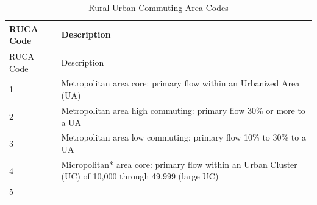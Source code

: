 \documentclass[10pt,]{article}
\begin{document}
\begin{longtable}[]{@{}ll@{}}
\caption{Rural-Urban Commuting Area Codes}\tabularnewline
\toprule
\begin{minipage}[b]{0.08\columnwidth}\raggedright
RUCA Code\strut
\end{minipage} & \begin{minipage}[b]{0.86\columnwidth}\raggedright
Description\strut
\end{minipage}\tabularnewline
\midrule
\endfirsthead
\toprule
\begin{minipage}[b]{0.08\columnwidth}\raggedright
RUCA Code\strut
\end{minipage} & \begin{minipage}[b]{0.86\columnwidth}\raggedright
Description\strut
\end{minipage}\tabularnewline
\midrule
\endhead
\begin{minipage}[t]{0.08\columnwidth}\raggedright
1\strut
\end{minipage} & \begin{minipage}[t]{0.86\columnwidth}\raggedright
Metropolitan area core: primary flow within an Urbanized Area (UA)\strut
\end{minipage}\tabularnewline
\begin{minipage}[t]{0.08\columnwidth}\raggedright
2\strut
\end{minipage} & \begin{minipage}[t]{0.86\columnwidth}\raggedright
Metropolitan area high commuting: primary flow 30\% or more to a
UA\strut
\end{minipage}\tabularnewline
\begin{minipage}[t]{0.08\columnwidth}\raggedright
3\strut
\end{minipage} & \begin{minipage}[t]{0.86\columnwidth}\raggedright
Metropolitan area low commuting: primary flow 10\% to 30\% to a UA\strut
\end{minipage}\tabularnewline
\begin{minipage}[t]{0.08\columnwidth}\raggedright
4\strut
\end{minipage} & \begin{minipage}[t]{0.86\columnwidth}\raggedright
Micropolitan* area core: primary flow within an Urban Cluster (UC) of
10,000 through 49,999 (large UC)\strut
\end{minipage}\tabularnewline
\begin{minipage}[t]{0.08\columnwidth}\raggedright
5\strut
\end{minipage} & \begin{minipage}[t]{0.86\columnwidth}\raggedright

\end{minipage}
\end{longtable}
\end{document}
